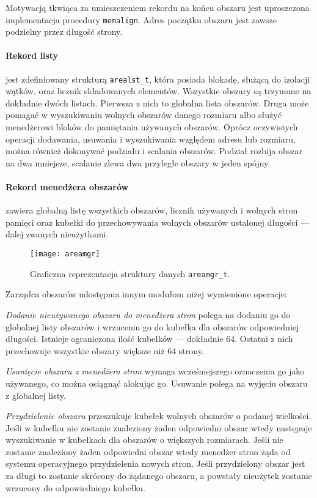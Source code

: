 \documentclass[12pt,a4paper,titlepage,twoside]{mwart}
\begin{document}
Motywacją tkwiąca za umieszczeniem rekordu na końcu obszaru jest uproszczona
implementacja procedury \texttt{memalign}. Adres początku obszaru jest zawsze
podzielny przez długość strony. 

\paragraph{Rekord listy} jest zdefiniowany strukturą \verb+arealst_t+, która
posiada blokadę, służącą do izolacji wątków, oraz licznik składowanych
elementów. Wszystkie obszary są trzymane na dokładnie dwóch listach. Pierwsza z
nich to globalna lista obszarów. Druga może pomagać w wyszukiwaniu wolnych
obszarów danego rozmiaru albo służyć menedżerowi bloków do pamiętania używanych
obszarów. Oprócz oczywistych operacji dodawania, usuwania i wyszukiwania
względem adresu lub rozmiaru, można również dokonywać podziału i scalania
obszarów. Podział rozbija obszar na dwa mniejsze, scalanie zlewa dwa przyległe
obszary w jeden spójny.

\paragraph{Rekord menedżera obszarów} zawiera globalną listę wszystkich
obszarów, licznik używanych i wolnych stron pamięci oraz kubełki do
przechowywania wolnych obszarów ustalonej długości --- dalej zwanych
nieużytkami.

\begin{figure}[ht]
\centering
\texttt{[image: areamgr]}
\caption{Graficzna reprezentacja struktury danych \texttt{areamgr\_t}.}
\end{figure}

Zarządca obszarów udostępnia innym modułom niżej wymienione operacje:

\textit{Dodanie nieużywanego obszaru do menedżera stron} polega na dodaniu go do
globalnej listy obszarów i wrzuceniu go do kubełka dla obszarów odpowiedniej
długości. Istnieje ograniczona ilość kubełków --- dokładnie 64. Ostatni z nich
przechowuje wszystkie obszary większe niż 64 strony.

\textit{Usunięcie obszaru z menedżera stron} wymaga wcześniejszego oznaczenia
go jako używanego, co można osiągnąć alokując go.  Usuwanie polega na wyjęciu
obszaru z globalnej listy.

\textit{Przydzielenie obszaru} przeszukuje kubełek wolnych obszarów o podanej
wielkości. Jeśli w kubełku nie zostanie znaleziony żaden odpowiedni obszar
wtedy następuje wyszukiwanie w kubełkach dla obszarów o większych rozmiarach.
Jeśli nie zostanie znaleziony żaden odpowiedni obszar wtedy menedżer stron żąda
od systemu operacyjnego przydzielenia nowych stron.  Jeśli przydzielony obszar
jest za długi to zostanie skrócony do żądanego obszaru, a powstały nieużytek
zostanie wrzucony do odpowiedniego kubełka.
\end{document}

